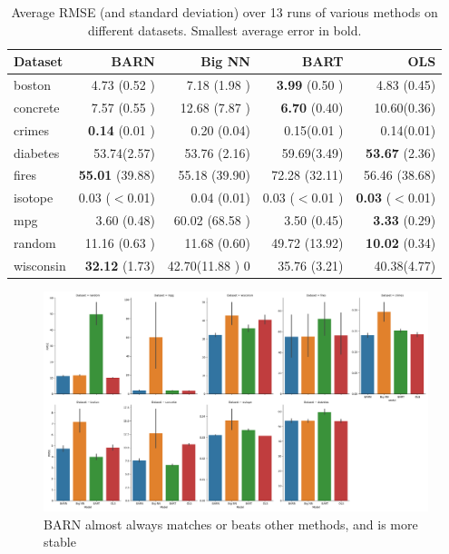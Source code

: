 \documentclass[12pt]{article}
\begin{document}
\begin{table}[htb]
\centering
\caption{Average RMSE (and standard deviation) over 13 runs of various methods on different datasets.  Smallest average error in bold.}
\begin{tabular}{lrrrr}
Dataset   &     BARN &    Big NN &      BART & OLS\\ \hline
boston    &  4.73 (0.52 )  &  7.18 (1.98 )  &  \textbf{3.99} (0.50 )  &  4.83 (0.45) \\
concrete   & 7.57 (0.55 )  & 12.68 (7.87 )  &  \textbf{6.70} (0.40)  & 10.60(0.36) \\
crimes     & \textbf{0.14 } (0.01 )  & 0.20 (0.04)  &  0.15(0.01 )  & 0.14(0.01) \\
diabetes  & 53.74(2.57)  & 53.76 (2.16)&  59.69(3.49)  & \textbf{53.67} (2.36) \\
fires     & \textbf{55.01} (39.88)  & 55.18 (39.90) &  72.28 (32.11)  & 56.46 (38.68) \\
    isotope    & 0.03  ($<$0.01)  & 0.04 (0.01)  &  0.03 ($<$0.01 )  & \textbf{0.03} ($<$0.01) \\
mpg        & 3.60 (0.48)  & 60.02 (68.58 )  &  3.50  (0.45)  & \textbf{3.33} (0.29) \\
random    & 11.16 (0.63 )  & 11.68 (0.60) &  49.72 (13.92)  & \textbf{10.02} (0.34) \\
wisconsin & \textbf{32.12} (1.73)  & 42.70(11.88 ) 0&  35.76 (3.21)  & 40.38(4.77) \\
\end{tabular}
    \label{tab:results}
\end{table}

\begin{figure}[ht]
\centering
    \includegraphics[scale=.3]{pres_results.png}
    \caption{BARN almost always matches or beats other methods, and is more stable}
    \label{fig:results}
\end{figure}
\end{document}
